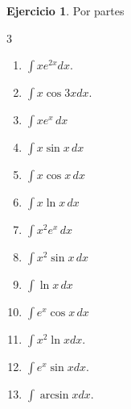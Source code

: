 \documentclass[12pt]{article}
\theoremstyle{definition}
\newtheorem{Ejer}[teorema]{Ejercicio}
\theoremstyle{remark}
\begin{document}
\begin{Ejer} Por partes
\begin{multicols}{3}
\begin{enumerate}[resume=integrales]
\item $\int xe^{2x}dx$.
\item $\int x\cos3x dx$.
\item $\displaystyle \int x e^x\,dx$
\item $\displaystyle \int x\sin x\,dx$
\item $\displaystyle \int x\cos x\,dx$
\item $\displaystyle \int x\ln x\,dx$
\item $\displaystyle \int x^2e^x\,dx$
\item $\displaystyle \int x^2\sin x\,dx$
\item $\displaystyle \int \ln x\,dx$
\item $\displaystyle \int e^x\cos x\,dx$

\item $\int x^2\ln xdx$.
\item $\int e^x\sin xdx$.
\item $\int\arcsin xdx$.
\end{enumerate}
\end{multicols}
\end{Ejer}
\end{document}
